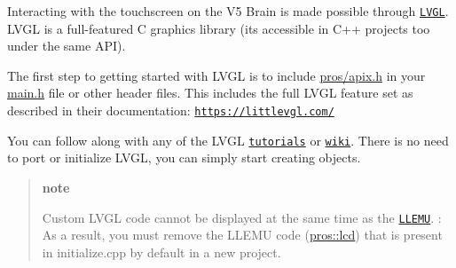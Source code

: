 Interacting with the touchscreen on the V5 Brain is made possible through \href{https://littlevgl.com}{\tt L\+V\+GL}. L\+V\+GL is a full-\/featured C graphics library (it\textquotesingle{}s accessible in C++ projects too under the same A\+PI).

The first step to getting started with L\+V\+GL is to include {\ttfamily \hyperlink{apix_8h}{pros/apix.\+h}} in your {\ttfamily \hyperlink{main_8h}{main.\+h}} file or other header files. This includes the full L\+V\+GL feature set as described in their documentation\+: \href{https://littlevgl.com/}{\tt https\+://littlevgl.\+com/}

You can follow along with any of the L\+V\+GL \href{https://github.com/littlevgl/lv_examples/tree/master/lv_tutorial}{\tt tutorials} or \href{https://docs.littlevgl.com/#Objects}{\tt wiki}. There is no need to port or initialize L\+V\+GL, you can simply start creating objects.

\begin{quote}
{\bfseries note}

Custom L\+V\+GL code cannot be displayed at the same time as the \href{./llemu.html}{\tt L\+L\+E\+MU}. \+: As a result, you must remove the L\+L\+E\+MU code ({\ttfamily \hyperlink{namespacepros_1_1lcd}{pros\+::lcd}}) that is present in {\ttfamily initialize.\+cpp} by default in a new project.\end{quote}
